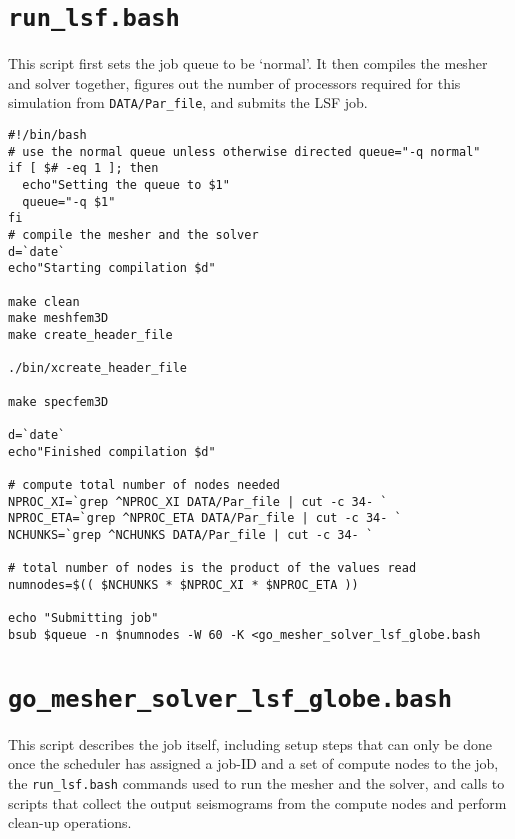 \section{\texttt{run\_lsf.bash}}

This script first sets the job queue to be `normal'. It then compiles
the mesher and solver together, figures out the number of processors
required for this simulation from \texttt{DATA/Par\_file}, and submits
the LSF job.
{\small
\begin{verbatim}
#!/bin/bash
# use the normal queue unless otherwise directed queue="-q normal"
if [ $# -eq 1 ]; then
  echo"Setting the queue to $1"
  queue="-q $1"
fi
# compile the mesher and the solver
d=`date`
echo"Starting compilation $d"

make clean
make meshfem3D
make create_header_file

./bin/xcreate_header_file

make specfem3D

d=`date`
echo"Finished compilation $d"

# compute total number of nodes needed
NPROC_XI=`grep ^NPROC_XI DATA/Par_file | cut -c 34- `
NPROC_ETA=`grep ^NPROC_ETA DATA/Par_file | cut -c 34- `
NCHUNKS=`grep ^NCHUNKS DATA/Par_file | cut -c 34- `

# total number of nodes is the product of the values read
numnodes=$(( $NCHUNKS * $NPROC_XI * $NPROC_ETA ))

echo "Submitting job"
bsub $queue -n $numnodes -W 60 -K <go_mesher_solver_lsf_globe.bash
\end{verbatim}
}

\section{\texttt{go\_mesher\_solver\_lsf\_globe.bash}}

This script describes the job itself, including setup steps that can
only be done once the scheduler has assigned a job-ID and a set of
compute nodes to the job, the \texttt{run\_lsf.bash} commands used
to run the mesher and the solver, and calls to scripts that collect
the output seismograms from the compute nodes and perform clean-up
operations.

